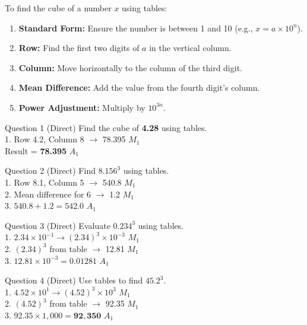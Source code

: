 \documentclass[12pt, a4paper, oneside]{article}
\begin{document}
\begin{tcolorbox}[colback=lightgrey, colframe=primaryblue, title=\textbf{Step-by-Step Table Usage}, arc=5pt]
    To find the cube of a number $x$ using tables:
    \begin{enumerate}
        \item \textbf{Standard Form:} Ensure the number is between 1 and 10 (e.g., $x = a \times 10^n$).
        \item \textbf{Row:} Find the first two digits of $a$ in the vertical column.
        \item \textbf{Column:} Move horizontally to the column of the third digit.
        \item \textbf{Mean Difference:} Add the value from the fourth digit's column.
        \item \textbf{Power Adjustment:} Multiply by $10^{3n}$.
    \end{enumerate}
\end{tcolorbox}

\begin{solvingbox}{Question 1 (Direct)}
Find the cube of \textbf{4.28} using tables. \\
1. Row 4.2, Column 8 $\rightarrow$ 78.395 \hfill $M_1$ \\
Result = \textbf{78.395} \hfill $A_1$
\end{solvingbox}

\begin{solvingbox}{Question 2 (Direct)}
Find $8.156^3$ using tables. \\
1. Row 8.1, Column 5 $\rightarrow$ 540.8 \hfill $M_1$ \\
2. Mean difference for 6 $\rightarrow$ 1.2 \hfill $M_1$ \\
3. $540.8 + 1.2 = \mathbf{542.0}$ \hfill $A_1$
\end{solvingbox}

\begin{solvingbox}{Question 3 (Direct)}
Evaluate $0.234^3$ using tables. \\
1. $2.34 \times 10^{-1} \rightarrow (2.34)^3 \times 10^{-3}$ \hfill $M_1$ \\
2. $(2.34)^3$ from table $\rightarrow$ 12.81 \hfill $M_1$ \\
3. $12.81 \times 10^{-3} = \mathbf{0.01281}$ \hfill $A_1$
\end{solvingbox}

\begin{solvingbox}{Question 4 (Direct)}
Use tables to find $45.2^3$. \\
1. $4.52 \times 10^1 \rightarrow (4.52)^3 \times 10^3$ \hfill $M_1$ \\
2. $(4.52)^3$ from table $\rightarrow$ 92.35 \hfill $M_1$ \\
3. $92.35 \times 1,000 = \mathbf{92,350}$ \hfill $A_1$
\end{solvingbox}
\end{document}
